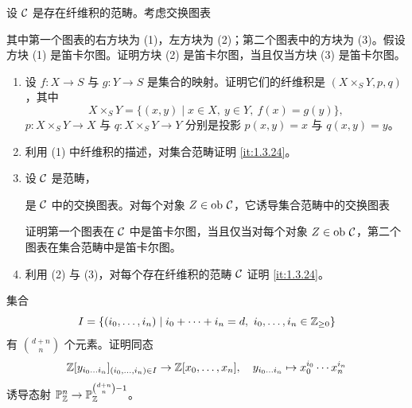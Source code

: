 \begin{exercises}
\item \label{ex:1.3.6} 设 $\mathcal{C}$ 是存在纤维积的范畴。考虑交换图表
\begin{center}
\qquad
{}
\end{center}
其中第一个图表的右方块为 (1)，左方块为 (2)；第二个图表中的方块为 (3)。假设方块 (1) 是笛卡尔图。证明方块 (2) 是笛卡尔图，当且仅当方块 (3) 是笛卡尔图。

\item \label{ex:1.3.7}
\begin{enumerate}[label=(\arabic*),leftmargin=2.4em]
  \item 设 $f\colon X\to S$ 与 $g\colon Y\to S$ 是集合的映射。证明它们的纤维积是 $(X\times_S Y,p,q)$，其中
  \[
  X\times_S Y=\{(x,y)\mid x\in X,\ y\in Y,\ f(x)=g(y)\},
  \]
  $p\colon X\times_S Y\to X$ 与 $q\colon X\times_S Y\to Y$ 分别是投影 $p(x,y)=x$ 与 $q(x,y)=y$。
  \item 利用 (1) 中纤维积的描述，对集合范畴证明 \ref{it:1.3.24}。
  \item 设 $\mathcal{C}$ 是范畴，
  \begin{center}
  \end{center}
  是 $\mathcal{C}$ 中的交换图表。对每个对象 $Z\in\operatorname{ob}\,\mathcal{C}$，它诱导集合范畴中的交换图表
  \begin{center}
  \end{center}
  证明第一个图表在 $\mathcal{C}$ 中是笛卡尔图，当且仅当对每个对象 $Z\in\operatorname{ob}\,\mathcal{C}$，第二个图表在集合范畴中是笛卡尔图。
  \item 利用 (2) 与 (3)，对每个存在纤维积的范畴 $\mathcal{C}$ 证明 \ref{it:1.3.24}。
\end{enumerate}

\item \label{ex:1.3.8} 集合
\[
I=\{(i_0,\dots,i_n)\mid i_0+\cdots+i_n=d,\ i_0,\dots,i_n\in \bZ_{\ge 0}\}
\]
有 $\binom{d+n}{n}$ 个元素。证明同态
\[
\mathbb{Z}[y_{i_0\dots i_n}]_{(i_0,\dots,i_n)\in I}\to \mathbb{Z}[x_0,\dots,x_n],\quad
y_{i_0\dots i_n}\mapsto x_0^{i_0}\cdots x_n^{i_n}
\]
诱导态射 $\mathbb{P}^n_{\mathbb{Z}}\to \mathbb{P}^{\binom{d+n}{n}-1}_{\mathbb{Z}}$。
\end{exercises}

